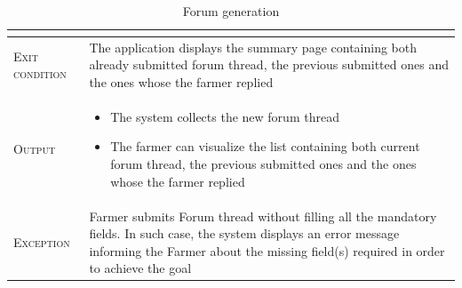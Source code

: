 \begin{table}[H]
\begin{tabular}{|l|p{}|}
\begin{itemize}
                                        \end{itemize}\\
        \hline %
        \textsc{Exit condition}    &  The application displays the summary page containing both already submitted forum thread, the previous submitted ones and the ones whose the farmer replied\\
    	\hline %
    	\textsc{Output}             &  \begin{itemize}
    	    \item The system collects the new forum thread
    	    \item The farmer can visualize the list containing both current forum thread, the previous submitted ones and the ones whose the farmer replied
    	\end{itemize}\\
    	\hline %
    	\textsc{Exception}         &   Farmer submits Forum thread without filling all the mandatory fields. In such case, the system displays an error message informing the Farmer about the missing field(s) required in order to achieve the goal\\
    	\hline %
        
    \end{tabular}


    \caption{\label{tab:Forum_generation}Forum generation}
\end{table}

